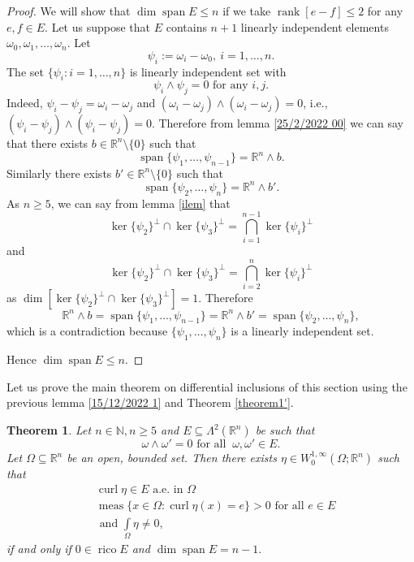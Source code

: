 \documentclass[11pt, a4paper, reqno]{amsart}
\numberwithin{equation}{section}
\newcommand{\spann}{\operatorname{span}}
\newcommand{\meas}{\operatorname{meas}}
\newcommand{\rank}{\operatorname{rank}}
\newcommand{\curl}{\operatorname{curl}}
\newcommand{\rico}{\operatorname{rico}}
\newtheorem{theorem}{Theorem}[section]
\begin{document}
\begin{proof}
We will show that $\dim \spann E\leq n$ if we take $\rank[e-f]\leq 2$ for any $e,f\in E.$ Let us suppose that $E$ contains $n+1$ linearly independent elements $\omega_0,\omega_1,\ldots, \omega_n.$ Let $$\psi_i:=\omega_i-\omega_0,\  i=1,\ldots, n.$$
The set $\{\psi_i:i=1,\ldots, n\}$ is linearly independent set with $$\psi_i\wedge \psi_j=0\textrm{ for any } i,j.$$
Indeed, $\psi_i-\psi_j=\omega_i-\omega_j$ and $(\omega_i-\omega_j)\wedge (\omega_i-\omega_j)=0$, i.e., $(\psi_i-\psi_j)\wedge (\psi_i-\psi_j)=0$. 
Therefore from lemma \ref{25/2/2022 00} we can say that there exists $b\in \mathbb R^n \setminus\{0\}$
such that $$\spann \{\psi_1,\ldots,\psi_{n-1}\}=\mathbb R^n\wedge b.$$
Similarly there exists $b'\in \mathbb R^n \setminus \{0\}$ 
such that $$\spann \{\psi_2,\ldots, \psi_n\}=\mathbb R^n \wedge b'.$$
As $n\geq 5$, we can say from lemma \ref{ilem} that $$\ker\{\psi_2\}^{\perp}\cap \ker \{\psi_3\}^{\perp}=\displaystyle\bigcap_{i=1}^{n-1}\ker \{\psi_i\}^{\perp}$$
and $$\ker \{\psi_2\}^{\perp}\cap \ker \{\psi_3\}^{\perp}=\displaystyle\bigcap_{i=2}^{n}\ker\{\psi_i\}^{\perp}$$
as $\dim [\ker \{\psi_2\}^{\perp}\cap \ker \{\psi_3\}^{\perp}]=1.$  Therefore $$\mathbb R^n\wedge b=\spann \{\psi_1,\ldots,\psi_{n-1}\}=\mathbb R^n\wedge b'=\spann \{\psi_2,\ldots, \psi_n\},$$
which is a contradiction because $\{\psi_1,\ldots, \psi_n\}$ is a linearly independent set. 

Hence $\dim \spann E\leq n.$
\end{proof}
Let us prove the main theorem on differential inclusions of this section using the previous lemma   \ref{15/12/2022 1} and Theorem \ref{theorem1'}.
\begin{theorem} \label{27/3/2024 theorem 1}
    Let $n\in \mathbb N, n\geq 5$ and $E\subseteq \Lambda^2(\mathbb R^n)$ be such that $$\omega \wedge \omega'=0 \textrm{ for all }\ \omega ,\omega'\in E.$$
    Let $\Omega \subseteq \mathbb R^n$ be  an open, bounded set.  Then there exists $\eta \in W_0^{1,\infty}(\Omega;\mathbb R^n)$ such that
    \begin{align} \label{16/12/2022 1}
     & \curl \eta \in E \textrm{ a.e. in } \Omega  \nonumber \\
      & \meas\{x\in \Omega : \curl \eta (x)=e\}>0 \textrm{ for all } e\in E\\
      & \textrm{ and } \int\limits_{\Omega}\eta \neq 0, \nonumber
     \end{align}
     if and only if $0\in \rico E$ and $\dim \spann E=n-1.$
\end{theorem}
\end{document}
